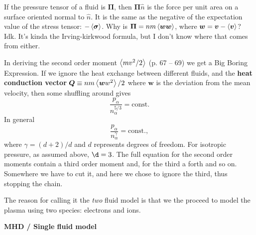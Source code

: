 \documentclass[10pt,landscape]{article}
\renewcommand{\vec}{\bm}
\newcommand{\topiccolor}{green}
\renewcommand{\section}[2]{%
	\renewcommand{\topiccolor}{#2}
	\begin{tcolorbox}[boxsep=0.5mm, left=1mm, right=1mm, top=0mm, bottom=0mm,
		colback=#2!30, colframe=#2, arc is angular]%
		\centering \textbf{#1}%
	\end{tcolorbox}%
	\nopagebreak%
}
\newcommand{\cbf}[1]{\textcolor{\topiccolor!80!black}{\textbf{#1}}}
\begin{document}
\begin{multicols*}{3}
\begin{tcolorbox}[title=An aside: wtf is a \textit{pressure tensor}?,
	colframe=\topiccolor!10!white, colback=white, coltitle=\topiccolor]
	If the pressure tensor of a fluid is $\vec \Pi$, then $\vec \Pi \hat n$ is
	the force per unit area on a surface oriented normal to $\hat n$.
	It is the same as the negative of the expectation value of the stress
	tensor: $-\expval{\vec \sigma}$.
	Why is $\vec \Pi = n m \expval{\vec w \vec w}$, where $\vec w = \vec v -
	\expval{\vec v}$? Idk. It's kinda the Irving-kirkwood formula, but I don't
	know where that comes from either.
\end{tcolorbox}

In deriving the second order moment $\left\langle mv^2/2\right\rangle$ (p. 67 -- 69) we get
a Big Boring Expression\texttrademark.
If we ignore the heat exchange between different fluids, and the
\cbf{heat conduction vector}
$\vec Q \equiv n m \expval{\vec w w^2} / 2$
where $\vec w$ is the deviation from the mean velocity,
then some shuffling around gives
\begin{equation*}
	\frac{p_\alpha}{n_\alpha^{5/3}} = \text{const.}
\end{equation*}
In general
\begin{equation}
	\frac{p_\alpha}{n_\alpha^\gamma} = \text{const.}
	\label{eq:state}, 
\end{equation}
where $\gamma=(d+2)/d$ and $d$ represents degrees of freedom. 
For isotropic pressure, as assumed above, $\d=3$.
The full equation for the second order moments contain a third order moment and,
for the third a forth and so on.
Somewhere we have to cut it, and here we chose to ignore the third,
thus stopping the chain.

The reason for calling it the \emph{two} fluid model is that we the proceed
to model the plasma using two species: electrons and ions.

\section{MHD / Single fluid model}{lime}


\end{multicols*}
\end{document}
